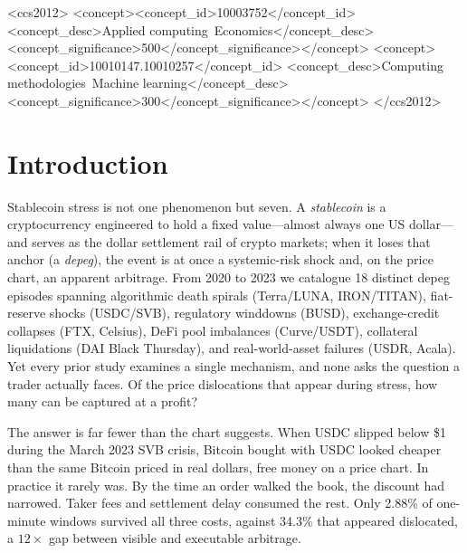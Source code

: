 \documentclass[sigconf,anonymous,natbib=false]{acmart}
\begin{document}
\begin{CCSXML}
<ccs2012>
<concept><concept_id>10003752</concept_id>
<concept_desc>Applied computing~Economics</concept_desc>
<concept_significance>500</concept_significance></concept>
<concept><concept_id>10010147.10010257</concept_id>
<concept_desc>Computing methodologies~Machine learning</concept_desc>
<concept_significance>300</concept_significance></concept>
</ccs2012>
\end{CCSXML}

\maketitle

\section{Introduction}
\label{sec:intro}

Stablecoin stress is not one phenomenon but seven.
A \emph{stablecoin} is a cryptocurrency engineered to hold a fixed value---almost
always one US dollar---and serves as the dollar settlement rail of crypto markets;
when it loses that anchor (a \emph{depeg}), the event is at once a systemic-risk
shock and, on the price chart, an apparent arbitrage.
From 2020 to 2023 we catalogue 18 distinct depeg episodes spanning
algorithmic death spirals (Terra/LUNA, IRON/TITAN), fiat-reserve shocks
(USDC/SVB), regulatory winddowns (BUSD), exchange-credit collapses
(FTX, Celsius), DeFi pool imbalances (Curve/USDT), collateral
liquidations (DAI Black Thursday), and real-world-asset failures
(USDR, Acala).
Yet every prior study examines a single mechanism, and none asks the
question a trader actually faces. Of the price dislocations that appear
during stress, how many can be captured at a profit?

The answer is far fewer than the chart suggests.
When USDC slipped below \$1 during the March 2023 SVB crisis, Bitcoin
bought with USDC looked cheaper than the same Bitcoin priced in real
dollars, free money on a price chart.
In practice it rarely was.
By the time an order walked the book, the discount had narrowed. Taker
fees and settlement delay consumed the rest.
Only 2.88\% of one-minute windows survived all three costs, against
34.3\% that appeared dislocated, a $12\times$ gap between visible and
executable arbitrage.
\end{document}
